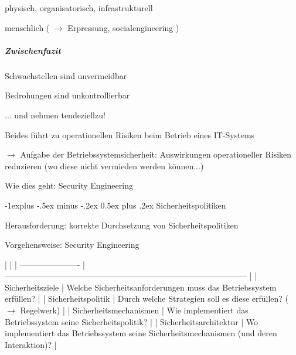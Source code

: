 \documentclass[a4paper]{article}
\makeatletter
\renewcommand{\subsection}{\@startsection{subsection}{2}{0mm}%
 {-1explus -.5ex minus -.2ex}%
 {0.5ex plus .2ex}%
 {\normalfont\normalsize\bfseries}}
\makeatother
\begin{document}
\begin{multicols}{3}
    \begin{itemize*}
        \item
        physisch, organisatorisch, infrastrukturell
        \item
        menschlich ( $\rightarrow$ Erpressung,
        socialengineering )
    \end{itemize*}


    \subparagraph{Zwischenfazit}

    \begin{itemize*}
        \item
        Schwachstellen sind unvermeidbar
        \item
        Bedrohungen sind unkontrollierbar
        \begin{itemize*}
            \item ... und nehmen tendeziellzu!
        \end{itemize*}
    \end{itemize*}

    Beides führt zu operationellen Risiken beim Betrieb eines IT-Systems

    $\rightarrow$ Aufgabe der Betriebssystemsicherheit:
    Auswirkungen operationeller Risiken reduzieren (wo diese nicht vermieden
    werden können...)

    Wie dies geht: Security Engineering


    \subsection{Sicherheitspolitiken}

    \begin{itemize*}
        \item
        Herausforderung: korrekte Durchsetzung von Sicherheitspolitiken
        \item
        Vorgehensweise: Security Engineering
    \end{itemize*}

    | | |
    ----------------------
    |
    -----------------------------------------------------------------------------------------
    | | Sicherheitsziele | Welche
    Sicherheitsanforderungen muss das Betriebssystem erfüllen? |
    | Sicherheitspolitik | Durch welche Strategien soll es
    diese erfüllen? ( $\rightarrow$ Regelwerk) |
    | Sicherheitsmechanismen | Wie implementiert das
    Betriebssystem seine Sicherheitspolitik? | |
    Sicherheitsarchitektur | Wo implementiert das Betriebssystem
    seine Sicherheitsmechanismen (und deren Interaktion)? |



\end{multicols}
\end{document}
